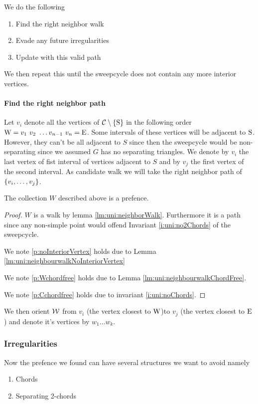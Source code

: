   We do the following
  \begin{enumerate}
    \itemsep=-4pt
    \item Find the right neighbor walk
    \item Evade any future irregularities
    \item Update with this valid path
  \end{enumerate}

  We then repeat this until the sweepcycle does not contain any more interior vertices.

  \paragraph{Find the right neighbor path}
    Let $v_i$ denote all the vertices of $\mathcal{C} \setminus \left\lbrace {\mathrm{S}} \right\rbrace$ in the following order $\mathrm{W} =  v_1 \  v_2 \  \ldots v_{n-1} \  v_n = \mathrm{E}$.
    Some intervals of these vertices will be adjacent to $\mathrm{S}$. However, they can't be all adjacent to $S$ since then the sweepcycle would be non-separating since we assumed $G$ has no separating triangles. We denote by $v_i$ the last vertex of fist interval of vertices adjacent to $S$ and by $v_j$ the first vertex of the second interval.
    As candidate walk we will take the right neighbor path of $\left\lbrace {v_i, \ldots, v_j} \right\rbrace$.

    \begin{lemma}
      \label{lm:uni:isPrefence}
    The collection $W$ described above is a prefence.
    \end{lemma}
    \begin{proof}
    $W$ is a walk by lemma \ref{lm:uni:neighborWalk}. Furthermore it is a path since any non-simple point would offend Invariant \ref{i:uni:no2Chords} of the sweepcycle.


    We note \ref{p:noInteriorVertex} holds due to Lemma \ref{lm:uni:neighbourwalkNoInteriorVertex}

    We note \ref{p:Wchordfree} holds due to Lemma \ref{lm:uni:neighbourwalkChordFree}.

    We note \ref{p:Cchordfree} holds due to invariant \ref{i:uni:noChords}.
    \end{proof}

    We then orient $\mathcal{W}$ from $v_i$ (the vertex closest to $\mathrm{W}$)to $v_j$ (the vertex closest to $\mathrm{E}$) and denote it's vertices by $w_1 \ldots w_k$.


    \subsubsection{Irregularities}
      Now the prefence we found can have several structures we want to avoid
      namely
      \begin{enumerate}
        \itemsep=-4pt
        \item Chords
        \item Separating 2-chords
      \end{enumerate}

